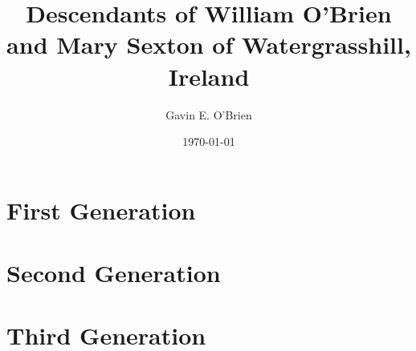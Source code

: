 \documentclass[oneside,letterpaper,12pt]{memoir}
\begin{document}
\author{Gavin E. O'Brien}
\title{Descendants of William O'Brien and Mary Sexton of Watergrasshill, Ireland}
\date{\today}

\maketitle
\tableofcontents




\chapter{First Generation}

\chapter{Second Generation}





\chapter{Third Generation}














\end{document}

